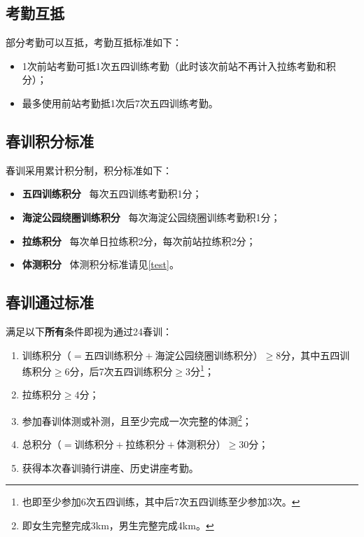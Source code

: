 \documentclass[UTF8]{ctexart}
\begin{document}
\subsection{考勤互抵}

部分考勤可以互抵，考勤互抵标准如下：

\begin{itemize}[nosep,left=4em]
    \item 1次前站考勤可抵1次五四训练考勤（此时该次前站不再计入拉练考勤和积分）；
    \item 最多使用前站考勤抵1次后7次五四训练考勤。 
\end{itemize}

\subsection{春训积分标准}
春训采用累计积分制，积分标准如下：

\begin{itemize}[nosep,left=4em]
    \item \textbf{五四训练积分} \ 每次五四训练考勤积1分；
    \item \textbf{海淀公园绕圈训练积分} \ 每次海淀公园绕圈训练考勤积1分；
    \item \textbf{拉练积分} \  每次单日拉练积2分，每次前站拉练积2分；
    \item \textbf{体测积分} \  体测积分标准请见\ref{test}。 
\end{itemize}

\subsection{春训通过标准}

满足以下\textbf{所有}条件即视为通过24春训：
\begin{enumerate}[nosep,left=4em]
    \item 训练积分（$=\text{五四训练积分}+\text{海淀公园绕圈训练积分}$）$\ge 8$分，其中五四训练积分$\ge 6$分，后7次五四训练积分$\ge 3$分\footnote{也即至少参加6次五四训练，其中后7次五四训练至少参加3次。}；
    \item 拉练积分$\ge 4$分；
    \item 参加春训体测或补测，且至少完成一次完整的体测\footnote{即女生完整完成3km，男生完整完成4km。}；
    \item 总积分（$=\text{训练积分}+\text{拉练积分}+\text{体测积分}$）$\ge 30$分；
    \item 获得本次春训骑行讲座、历史讲座考勤。
\end{enumerate}
\end{document}
